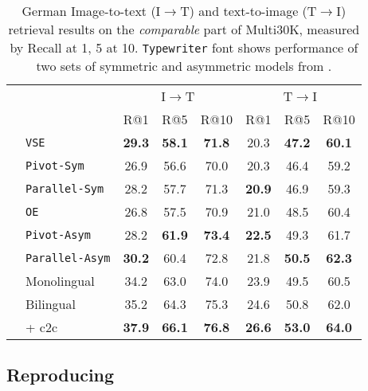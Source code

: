 \begin{table*}[h!]
\centering
\renewcommand{\arraystretch}{1.3}
\begin{tabular}{llcccccc}
\toprule
& & \multicolumn{3}{c}{I$\rightarrow$T}  & \multicolumn{3}{c}{T$\rightarrow$I}   \\
 						& & R@1 & R@5 & R@10 & R@1 & R@5 & R@10 \\
\cmidrule{3-8}
\parbox[t]{2mm}{} & {\tt VSE} 			 	& \bf{29.3} & \bf{58.1} & \bf{71.8} & 20.3 & \bf{47.2} & \bf{60.1}\\
& {\tt Pivot-Sym}			& 26.9  & 56.6  & 70.0 & 20.3 & 46.4 & 59.2 \\
& {\tt Parallel-Sym}      & 28.2  & 57.7  & 71.3 & \bf{20.9} & 46.9 & 59.3 \\
\midrule
\parbox[t]{2mm}{} & {\tt OE} 				& 26.8 & 57.5 & 70.9 & 21.0 & 48.5 & 60.4 \\
& {\tt Pivot-Asym} 		& 28.2 & \bf{61.9} & \bf{73.4} & \bf{22.5} & 49.3 & 61.7 \\
& {\tt Parallel-Asym}     & \bf{30.2} & 60.4 & 72.8 & 21.8 & \bf{50.5} & \bf{62.3} \\
\midrule
& Monolingual				& 34.2 & 63.0 & 74.0 & 23.9 & 49.5 & 60.5\\
& Bilingual 				& 35.2 & 64.3 & 75.3 & 24.6 & 50.8 & 62.0\\
& + c2c     				& \bf{37.9} & \bf{66.1} & \bf{76.8} & \bf{26.6} & \bf{53.0} & \bf{64.0} \\
\bottomrule
\end{tabular}
\caption{German Image-to-text (I$\rightarrow$T) and text-to-image (T$\rightarrow$I) retrieval results on the \emph{comparable} part of Multi30K, measured by Recall at 1, 5 at 10. {\tt Typewriter} font shows performance of two sets of symmetric and asymmetric models from \cite{gella2017image}.}
\label{tab:bi:bilingualGer}
\end{table*}


\subsection{Reproducing \cite{gella2017image}}
\label{sec:gella}

